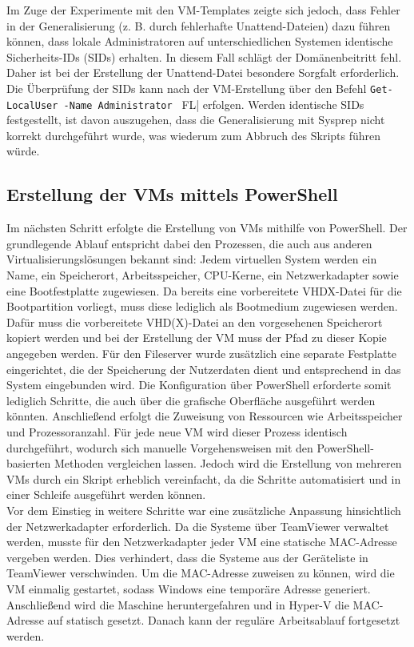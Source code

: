 \documentclass[a4paper,12pt]{article}
\begin{document}
Im Zuge der Experimente mit den VM-Templates zeigte sich jedoch, dass Fehler in der Generalisierung (z. B. durch fehlerhafte Unattend-Dateien) dazu führen können, dass lokale Administratoren auf unterschiedlichen Systemen identische Sicherheits-IDs (SIDs) erhalten. 
In diesem Fall schlägt der Domänenbeitritt fehl. Daher ist bei der Erstellung der Unattend-Datei besondere Sorgfalt erforderlich. 
Die Überprüfung der SIDs kann nach der VM-Erstellung über den Befehl \lstinline|Get-LocalUser -Name Administrator | FL| erfolgen. 
Werden identische SIDs festgestellt, ist davon auszugehen, dass die Generalisierung mit Sysprep nicht korrekt durchgeführt wurde, was wiederum zum Abbruch des Skripts führen würde.


\subsection{Erstellung der VMs mittels PowerShell}

Im nächsten Schritt erfolgte die Erstellung von VMs mithilfe von PowerShell.
Der grundlegende Ablauf entspricht dabei den Prozessen, die auch aus anderen Virtualisierungslösungen bekannt sind:
Jedem virtuellen System werden ein Name, ein Speicherort, Arbeitsspeicher, CPU-Kerne, ein Netzwerkadapter sowie eine Bootfestplatte zugewiesen.
Da bereits eine vorbereitete VHDX-Datei für die Bootpartition vorliegt, muss diese lediglich als Bootmedium zugewiesen werden.
Dafür muss die vorbereitete VHD(X)-Datei an den vorgesehenen Speicherort kopiert werden und bei der Erstellung der VM muss der Pfad zu dieser Kopie angegeben werden.
Für den Fileserver wurde zusätzlich eine separate Festplatte eingerichtet, die der Speicherung der Nutzerdaten dient und entsprechend in das System eingebunden wird.
Die Konfiguration über PowerShell erforderte somit lediglich Schritte, die auch über die grafische Oberfläche ausgeführt werden könnten.
Anschließend erfolgt die Zuweisung von Ressourcen wie Arbeitsspeicher und Prozessoranzahl.
Für jede neue VM wird dieser Prozess identisch durchgeführt, wodurch sich manuelle Vorgehensweisen mit den PowerShell-basierten Methoden vergleichen lassen.
Jedoch wird die Erstellung von mehreren VMs durch ein Skript erheblich vereinfacht, da die Schritte automatisiert und in einer Schleife ausgeführt werden können.\\

Vor dem Einstieg in weitere Schritte war eine zusätzliche Anpassung hinsichtlich der Netzwerkadapter erforderlich.
Da die Systeme über TeamViewer verwaltet werden, musste für den Netzwerkadapter jeder VM eine statische MAC-Adresse vergeben werden.
Dies verhindert, dass die Systeme aus der Geräteliste in TeamViewer verschwinden.
Um die MAC-Adresse zuweisen zu können, wird die VM einmalig gestartet, sodass Windows eine temporäre Adresse generiert.
Anschließend wird die Maschine heruntergefahren und in Hyper-V die MAC-Adresse auf statisch gesetzt.
Danach kann der reguläre Arbeitsablauf fortgesetzt werden.
\end{document}
